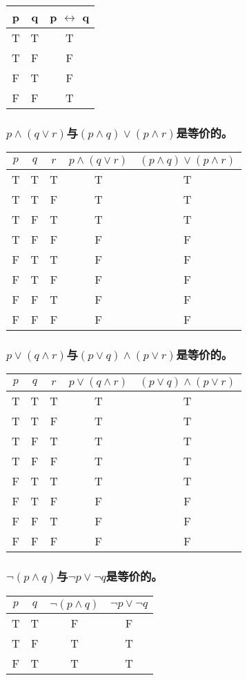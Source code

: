\documentclass{beamer}
\begin{document}
\begin{CJK*}{UTF8}{gbsn}
\begin{frame}
  \begin{tabular}{cc|c}
    p& q& p $\leftrightarrow$ q\\
    \hline
    T&T&T\\
    T&F&F\\
    F&T&F\\
    F&F&T\\
  \end{tabular}
\end{frame}
\begin{frame}
\frametitle{$p\land (q\lor r)$与$(p\land q)\lor (p \land r)$是等价的。}
\begin{tabular}{ccc|cc}
  $p$& $q$& $r$& $p\land (q\lor r)$&$(p\land q)\lor (p \land r)$\\
  \hline
 T& T&T&T&T\\
  T&T&F&T&T\\
  T&F&T&T&T\\
   T& F&F&F&F\\
  F&T&T&F&F\\
  F&T&F&F&F\\
 F& F&T&F&F\\
  F&  F&F&F&F\\      
\end{tabular}
\end{frame}
\begin{frame}
  \frametitle{$p\lor (q\land r)$与$(p\lor q)\land (p \lor r)$是等价的。}
  \begin{tabular}{ccc|cc}
    $p$& $q$& $r$&$p\lor (q\land r)$ &$(p\lor q)\land (p \lor r)$\\
    \hline
    T&T&T&T&T\\
    T&T&F&T&T\\
    T&F&T&T&T\\
     T& F&F&T&T\\
    F&T&T&T&T\\
    F&T&F&F&F\\
    F&F&T&F&F\\
     F&F&F&F&F\\
  \end{tabular}
\end{frame}
\begin{frame}
  \frametitle{$\lnot (p\land q)$与$\lnot p \lor \lnot q$是等价的。}
  \begin{tabular}{cc|cc}
    $p$& $q$&$\lnot (p\land q)$ &$\lnot p \lor \lnot q$\\
    \hline
    T&T&F&F\\
    T&F&T&T\\
    F&T&T&T\\

\end{tabular}
\end{frame}
\end{CJK*}
\end{document}
